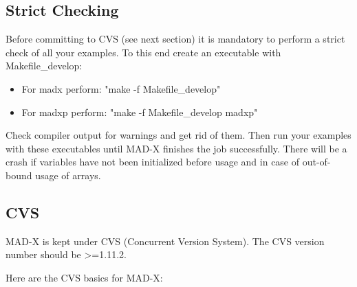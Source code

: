\begin{itemize}
\subsection{Strict Checking} Before committing to CVS (see next section) it is mandatory to perform a strict check of all your examples. To this end create an executable with Makefile\_develop: 


\begin{itemize}
	\item  For madx perform: "make -f Makefile\_develop" 
	\item  For madxp perform: "make -f Makefile\_develop madxp" 
\end{itemize} Check compiler output for warnings and get rid of them. Then run your examples with these executables until MAD-X finishes the job successfully. There will be a crash if variables have not been initialized before usage and in case of out-of-bound usage of arrays. 



\subsection{CVS} MAD-X is kept under CVS (Concurrent Version System). The CVS version number should be \textgreater =1.11.2. 

 Here are the  CVS basics for MAD-X: 



\end{itemize}
